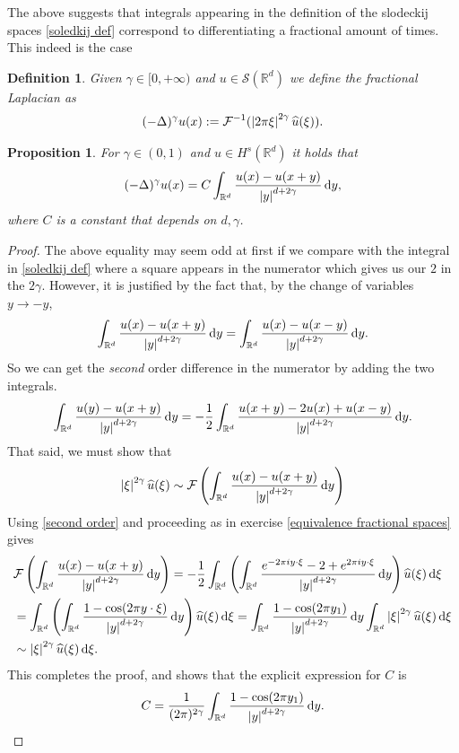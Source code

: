 \documentclass[
    a4paper,
    DIV=14,
    abstract=true,
    numbers=noenddot
]
{scrartcl}
\newtheorem{proposition}[theorem]{Proposition}
\newtheorem{definition}[theorem]{Definition}
\theoremstyle{definition}
\newcommand{\wh}[1]{\widehat{#1}}
\renewcommand{\d}{\,\mathrm{d}}\newcommand{\dx}{\,\mathrm{d}x}
\newcommand{\R}{\mathbb{R}}
\newcommand{\Ff}{\mathcal{F}}
\newcommand{\Ss}{\mathcal{S}}
\begin{document}
The above suggests that integrals appearing in the definition of the slodeckij spaces \ref{soledkij def} correspond to differentiating a fractional amount of times. This indeed is the case
\begin{definition}
  Given $\gamma  \in [0,+\infty)$ and $u \in \Ss (\R^d)$ we define the fractional Laplacian as
  \begin{align*}
    (-\Delta )^{\gamma }u(x):= \mathcal{F}^{-1}(\abs{2\pi\xi}^{2\gamma }\wh{u}(\xi )).
  \end{align*}
\end{definition}
\begin{proposition}
  For $\gamma  \in (0,1)$ and $u \in H^{s}(\R^d)$ it holds that
  \begin{align*}
    (-\Delta )^{\gamma }u(x)=C\int_{\R^d}\frac{u(x)-u(x+y)}{\abs{y}^{d+2\gamma}}\d y,
  \end{align*}
  where $C$ is a constant that depends on $d,\gamma $.
\end{proposition}
\begin{proof}
  The above equality may seem odd at first if we compare with the integral in \ref{soledkij def} where a square appears in the numerator which gives us our $2$  in the $2 \gamma $. However, it is justified by the fact that, by the change of variables $y \to -y$,
  \begin{align*}
    \int_{\R^d}\frac{u(x)-u(x+y)}{\abs{y}^{d+2\gamma}}\d y=\int_{\R^d}\frac{u(x)-u(x-y)}{\abs{y}^{d+2\gamma}}\d y.
  \end{align*}
  So we can get the \emph{second} order difference in the numerator by adding the two integrals.
  \begin{align}\label{second order}
    \int_{\R^d}\frac{u(y)-u(x+y)}{\abs{y}^{d+2\gamma}}\d y=-\frac{1}{2}\int_{\R^d}\frac{u(x+y)-2u(x)+u(x-y)}{\abs{y}^{d+2\gamma}}\d y.
  \end{align}
  That said, we must show that
  \begin{align*}
    \abs{\xi}^{2\gamma }\wh{u}(\xi )\sim \Ff \left(\int_{\R^d}\frac{u(x)-u(x+y)}{\abs{y}^{d+2\gamma}}\d y\right)
  \end{align*}
  Using \eqref{second order} and proceeding as in exercise \ref{equivalence fractional spaces} gives
  \begin{align*}
     & \Ff \left(\int_{\R^d}\frac{u(x)-u(x+y)}{\abs{y}^{d+2\gamma}}\d y\right)= -\frac{1}{2} \int_{\R^d}\left(\int_{\R^d}\frac{e^{-2\pi i y \cdot \xi}-2+e^{2\pi i y \cdot \xi}}{\abs{y}^{d+2\gamma}}\d y\right) \wh{u}(\xi)\d \xi       \\
     & =\int_{\R^d}\left(\int_{\R^d}\frac{1-\cos(2\pi y \cdot \xi)}{\abs{y}^{d+2\gamma}}\d y\right) \wh{u}(\xi)\d \xi =\int_{\R^d}  \frac{1-\cos(2\pi  y_1) }{\abs{y}^{d+2\gamma	}}\d y\int_{\R^d}\abs{\xi}^{2 \gamma }\wh{u}(\xi)\d \xi \\& \sim \abs{\xi}^{2 \gamma }\wh{u}(\xi)\d \xi.
  \end{align*}
  This completes the proof, and shows that the explicit expression for $C$ is
  \begin{align*}
    C=\frac{1}{(2\pi)^{2 \gamma }}\int_{\R^d}  \frac{1-\cos(2\pi  y_1) }{\abs{y}^{d+2\gamma	}}\d y.
  \end{align*}
\end{proof}
\end{document}

